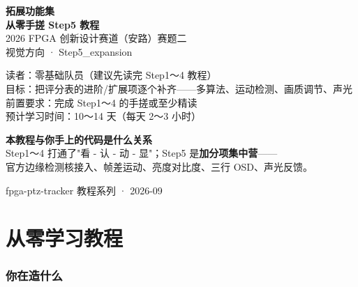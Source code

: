 \documentclass[11pt]{ctexart}
\begin{document}
\begin{titlepage}
\centering
\vspace*{2.2cm}
{\color{deep}\Huge\bfseries 拓展功能集}\\[6pt]
{\color{deep}\Large\bfseries 从零手搓 Step5 教程}\\[14pt]
{\large 2026 FPGA 创新设计赛道（安路）赛题二}\\[6pt]
{\large 视觉方向 · Step5\_expansion}\\[20pt]

\begin{tcolorbox}[enhanced, colback=codebg, colframe=accent, boxrule=0.8pt,
  arc=2mm, width=12.5cm, left=4mm, right=4mm, top=3mm, bottom=3mm]
\centering
{\small 读者：零基础队员（建议先读完 Step1～4 教程）\\
目标：把评分表的进阶/扩展项逐个补齐——多算法、运动检测、画质调节、声光\\
前置要求：完成 Step1～4 的手搓或至少精读\\
预计学习时间：10～14 天（每天 2～3 小时）}
\end{tcolorbox}

\vspace{8mm}
\begin{tcolorbox}[enhanced, colback=tipbg, colframe=tipline, boxrule=0.5pt,
  arc=2mm, width=12.5cm, left=4mm, right=4mm, top=2mm, bottom=2mm]
\centering
{\small\color{deep} \textbf{本教程与你手上的代码是什么关系}\\
Step1～4 打通了"看 - 认 - 动 - 显"；Step5 是\textbf{加分项集中营}——\\
官方边缘检测核接入、帧差运动、亮度对比度、三行 OSD、声光反馈。}
\end{tcolorbox}

\vfill
{\small\color{black!50} fpga-ptz-tracker 教程系列 · 2026-09}
\end{titlepage}

\tableofcontents
\newpage

\part{从零学习教程}

\section{你在造什么}
\end{document}
